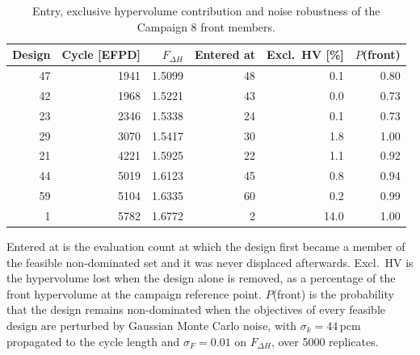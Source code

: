 \begin{table}[htbp]
  \centering
  \begin{threeparttable}
  \caption[Stability of the Campaign 8 front]{Entry, exclusive hypervolume contribution and noise robustness of the Campaign 8 front members.}
  \label{tab:c8-front-stability}
  \begin{tabular}{rrrrrr}
    \toprule
    Design & Cycle [EFPD] & $F_{\Delta H}$ & Entered at & Excl.\ HV [\%] & $P$(front) \\
    \midrule
    47 & 1941 & 1.5099 & 48 & 0.1 & 0.80 \\
    42 & 1968 & 1.5221 & 43 & 0.0 & 0.73 \\
    23 & 2346 & 1.5338 & 24 & 0.1 & 0.73 \\
    29 & 3070 & 1.5417 & 30 & 1.8 & 1.00 \\
    21 & 4221 & 1.5925 & 22 & 1.1 & 0.92 \\
    44 & 5019 & 1.6123 & 45 & 0.8 & 0.94 \\
    59 & 5104 & 1.6335 & 60 & 0.2 & 0.99 \\
    1 & 5782 & 1.6772 & 2 & 14.0 & 1.00 \\
    \bottomrule
  \end{tabular}
  \begin{tablenotes}\footnotesize
    \item Entered at is the evaluation count at which the design first became a member of the feasible non-dominated set and it was never displaced afterwards. Excl.\ HV is the hypervolume lost when the design alone is removed, as a percentage of the front hypervolume at the campaign reference point. $P$(front) is the probability that the design remains non-dominated when the objectives of every feasible design are perturbed by Gaussian Monte Carlo noise, with $\sigma_k = 44$\,pcm propagated to the cycle length and $\sigma_F = 0.01$ on $F_{\Delta H}$, over 5000 replicates.
  \end{tablenotes}
  \end{threeparttable}
\end{table}

